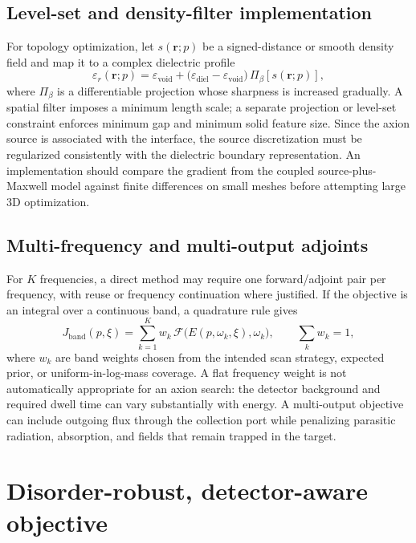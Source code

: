 \documentclass[10.5pt,a4paper]{article}
\newcommand{\eps}{\varepsilon}
\begin{document}
\subsection{Level-set and density-filter implementation}
For topology optimization, let $s(\mathbf r;p)$ be a signed-distance or smooth density field and map it to a complex dielectric profile
\begin{equation}
\eps_r(\mathbf r;p)=\eps_{\mathrm{void}}+\bigl(\eps_{\mathrm{diel}}-\eps_{\mathrm{void}}\bigr)\,\Pi_\beta[s(\mathbf r;p)],
\label{eq:epsmap}
\end{equation}
where $\Pi_\beta$ is a differentiable projection whose sharpness is increased gradually. A spatial filter imposes a minimum length scale; a separate projection or level-set constraint enforces minimum gap and minimum solid feature size. Since the axion source is associated with the interface, the source discretization must be regularized consistently with the dielectric boundary representation. An implementation should compare the gradient from the coupled source-plus-Maxwell model against finite differences on small meshes before attempting large 3D optimization.

\subsection{Multi-frequency and multi-output adjoints}
For $K$ frequencies, a direct method may require one forward/adjoint pair per frequency, with reuse or frequency continuation where justified. If the objective is an integral over a continuous band, a quadrature rule gives
\begin{equation}
J_{\mathrm{band}}(p,\xi)=\sum_{k=1}^{K}w_k\,\mathcal F\bigl(E(p,\omega_k,\xi),\omega_k\bigr),\qquad \sum_kw_k=1,
\label{eq:bandobj}
\end{equation}
where $w_k$ are band weights chosen from the intended scan strategy, expected prior, or uniform-in-log-mass coverage. A flat frequency weight is not automatically appropriate for an axion search: the detector background and required dwell time can vary substantially with energy. A multi-output objective can include outgoing flux through the collection port while penalizing parasitic radiation, absorption, and fields that remain trapped in the target.

\section{Disorder-robust, detector-aware objective}
\end{document}
